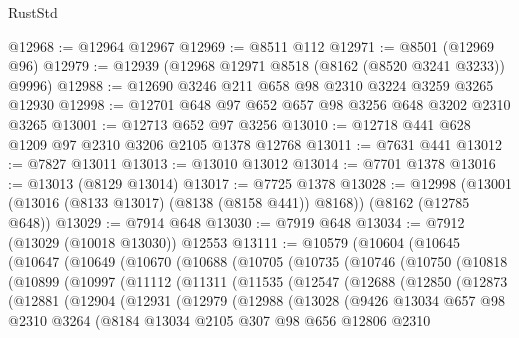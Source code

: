 \begin{lexlean}{RustStd}
\begin{coremodule}
@12968 := @12964 @12967
@12969 := @8511 @112
@12971 := @8501 (@12969 @96)
@12979 := @12939 (@12968 @12971 @8518 (@8162 (@8520 @3241 @3233)) @9996)
@12988 := @12690 @3246 @211 @658 @98 @2310 @3224 @3259 @3265 @12930
@12998 := @12701 @648 @97 @652 @657 @98 @3256 @648 @3202 @2310 @3265
@13001 := @12713 @652 @97 @3256
@13010 := @12718 @441 @628 @1209 @97 @2310 @3206 @2105 @1378 @12768
@13011 := @7631 @441
@13012 := @7827 @13011
@13013 := @13010 @13012
@13014 := @7701 @1378
@13016 := @13013 (@8129 @13014)
@13017 := @7725 @1378
@13028 := @12998 (@13001 (@13016 (@8133 @13017) (@8138 (@8158 @441)) @8168)) (@8162 (@12785 @648))
@13029 := @7914 @648
@13030 := @7919 @648
@13034 := @7912 (@13029 (@10018 @13030)) @12553
@13111 := @10579
    (@10604
      (@10645
        (@10647
          (@10649
            (@10670
              (@10688
                (@10705
                  (@10735
                    (@10746
                      (@10750
                        (@10818
                          (@10899
                            (@10997
                              (@11112
                                (@11311
                                  (@11535
                                    (@12547
                                      (@12688
                                        (@12850
                                          (@12873
                                            (@12881
                                              (@12904
                                                (@12931
                                                  (@12979
                                                    (@12988
                                                      (@13028
                                                        (@9426
                                                          @13034
                                                          @657
                                                          @98
                                                          @2310
                                                          @3264
                                                          (@8184
                                                            @13034
                                                            @2105
                                                            @307
                                                            @98
                                                            @656
                                                            @12806
                                                            @2310

\end{coremodule}
\end{lexlean}
